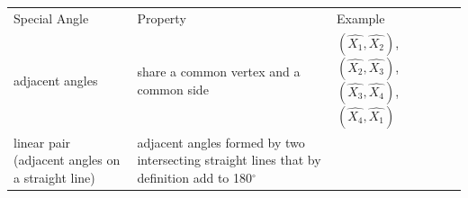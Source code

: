{{\begin{center}
\begin{xtabular}[t]{|l|l|l|}
        Special Angle &
        Property &
        Example%
     \tabularnewline{}
        adjacent angles &
        share a common vertex and a common side &
        \begin{math}\left(\hat{{X}_{1}},\hat{{X}_{2}}\right)\end{math}, \begin{math}\left(\hat{{X}_{2}},\hat{{X}_{3}}\right)\end{math}, \begin{math}\left(\hat{{X}_{3}},\hat{{X}_{4}}\right)\end{math}, \begin{math}\left(\hat{{X}_{4}},\hat{{X}_{1}}\right)\end{math}%
     \tabularnewline{}
        linear pair (adjacent angles on a straight line) &
        adjacent angles formed by two intersecting straight lines that by definition add to 180\begin{math}{}^{\circ }\end{math} &

\end{xtabular}
\end{center}}}

